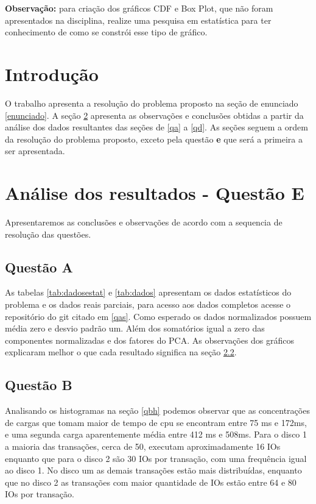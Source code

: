 \documentclass[11pt,a4paper,openany,oneside]{abntex2}
\begin{document}
\textbf{Observação:} para criação dos gráficos CDF e Box Plot, que não foram apresentados na disciplina, realize uma pesquisa em estatística para ter conhecimento de como se constrói esse tipo de gráfico.

\chapter{Introdução}	

O trabalho apresenta a resolução do problema proposto na seção de enunciado \ref{enunciado}. A seção \ref{qe} apresenta as observações e conclusões obtidas a partir da análise dos dados resultantes das seções de \ref{qa} a  \ref{qd}. As seções seguem a ordem da resolução do problema proposto, exceto pela questão \textbf{e} que será a primeira a ser apresentada.
	
\chapter{Análise dos resultados - Questão E}
\label{qe}
Apresentaremos as conclusões e observações de acordo com a sequencia de resolução das questões.
\section{Questão A}
\label{qea}
As tabelas \ref{tab:dadosestat} e \ref{tab:dados} apresentam os dados estatísticos do problema e os dados reais parciais, para acesso aos dados completos acesse o repositório do git citado em \ref{qas}. Como esperado os dados normalizados possuem média zero e desvio padrão um. Além dos somatórios igual a zero das componentes normalizadas e dos fatores do PCA. As observações dos gráficos explicaram melhor o que cada resultado significa na seção \ref{qeb}.

\section{Questão B}
\label{qeb}

Analisando os histogramas na seção \ref{qbh} podemos observar que as concentrações de cargas que tomam maior de tempo de cpu se encontram entre 75 ms e 172ms, e uma segunda carga aparentemente média entre 412 ms e 508ms.
Para o disco 1 a maioria das transações, cerca de 50,  executam aproximadamente 16 IOs enquanto que para o disco 2 são 30 IOs por transação, com uma frequência igual ao disco 1. No disco um as demais transações estão mais distribuídas, enquanto que no disco 2 as transações com maior quantidade de IOs estão entre 64 e 80 IOs por transação.
\end{document}
